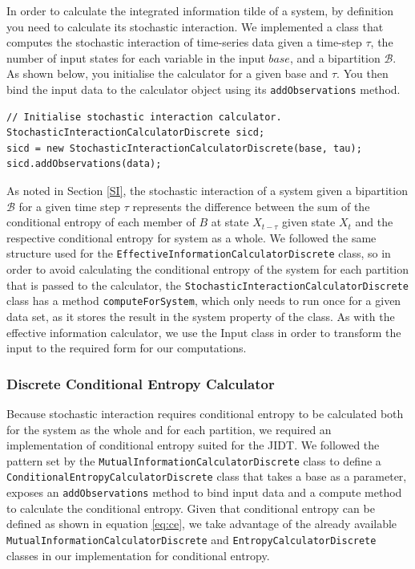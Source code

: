 \documentclass[a4paper,11pt]{article}
\begin{document}
In order to calculate the integrated information tilde of a system, by definition you need to calculate its stochastic interaction. We implemented a class that computes the stochastic interaction of time-series data given a time-step $\tau$, the number of input states for each variable in the input $base$, and a bipartition $\mathcal{B}$. As shown below, you initialise the calculator for a given base and $\tau$. You then bind the input data to the calculator object using its \texttt{addObservations} method.

\begin{verbatim}
// Initialise stochastic interaction calculator.
StochasticInteractionCalculatorDiscrete sicd;
sicd = new StochasticInteractionCalculatorDiscrete(base, tau);
sicd.addObservations(data);
\end{verbatim}

As noted in Section \ref{SI}, the stochastic interaction of a system given a bipartition $\mathcal{B}$ for a given time step $\tau$ represents the difference between the sum of the conditional entropy of each member of $B$ at state $X_{t-\tau}$ given state $X_t$ and the respective conditional entropy for system as a whole. We followed the same structure used for the \texttt{EffectiveInformationCalculatorDiscrete} class, so in order to avoid calculating the conditional entropy of the system for each partition that is passed to the calculator, the \texttt{StochasticInteractionCalculatorDiscrete} class has a method \texttt{computeForSystem}, which only needs to run once for a given data set, as it stores the result in the system property of the class. As with the effective information calculator, we use the Input class in order to transform the input to the required form for our computations.

\subsubsection{Discrete Conditional Entropy Calculator}

Because stochastic interaction requires conditional entropy to be calculated both for the system as the whole and for each partition, we required an implementation of conditional entropy suited for the JIDT. We followed the pattern set by the \texttt{MutualInformationCalculatorDiscrete} class to define a \texttt{ConditionalEntropyCalculatorDiscrete} class that takes a base as a parameter, exposes an \texttt{addObservations} method to bind input data and a compute method to calculate the conditional entropy. Given that conditional entropy can be defined as shown in equation \ref{eq:ce}, we take advantage of the already available \texttt{MutualInformationCalculatorDiscrete} and \texttt{EntropyCalculatorDiscrete} classes in our implementation for conditional entropy.
\end{document}
